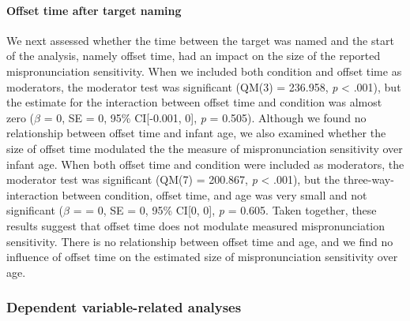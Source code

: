 \documentclass[man]{apa6}
\let\oldparagraph\paragraph
\renewcommand{\paragraph}[1]{\oldparagraph{#1}\mbox{}}
\theoremstyle{definition}
\theoremstyle{definition}
\theoremstyle{definition}
\theoremstyle{remark}
\begin{document}
\paragraph{Offset time after target
naming}\label{offset-time-after-target-naming}

We next assessed whether the time between the target was named and the
start of the analysis, namely offset time, had an impact on the size of
the reported mispronunciation sensitivity. When we included both
condition and offset time as moderators, the moderator test was
significant (QM(3) = 236.958, \emph{p} \textless{} .001), but the
estimate for the interaction between offset time and condition was
almost zero (\(\beta\) = 0, SE = 0, 95\% CI{[}-0.001, 0{]}, \emph{p} =
0.505). Although we found no relationship between offset time and infant
age, we also examined whether the size of offset time modulated the the
measure of mispronunciation sensitivity over infant age. When both
offset time and condition were included as moderators, the moderator
test was significant (QM(7) = 200.867, \emph{p} \textless{} .001), but
the three-way-interaction between condition, offset time, and age was
very small and not significant (\(\beta\) = = 0, SE = 0, 95\% CI{[}0,
0{]}, \emph{p} = 0.605. Taken together, these results suggest that
offset time does not modulate measured mispronunciation sensitivity.
There is no relationship between offset time and age, and we find no
influence of offset time on the estimated size of mispronunciation
sensitivity over age.

\subsubsection{Dependent variable-related
analyses}\label{dependent-variable-related-analyses}
\end{document}
